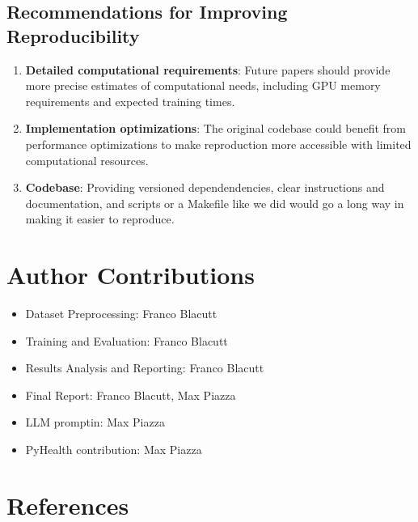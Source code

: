 \documentclass[10pt,letterpaper,twocolumn]{article}
\begin{document}
\subsection{Recommendations for Improving Reproducibility}

\begin{enumerate}
    \item \textbf{Detailed computational requirements}: Future papers should provide more precise estimates of computational needs, including GPU memory requirements and expected training times.
    
    \item \textbf{Implementation optimizations}: The original codebase could benefit from performance optimizations to make reproduction more accessible with limited computational resources.
    
    \item \textbf{Codebase}: Providing versioned dependendencies, clear instructions and documentation, and scripts or a Makefile like we did would go a long way in making it easier to reproduce.
\end{enumerate}

\section*{Author Contributions}

\begin{itemize}
    \item Dataset Preprocessing: Franco Blacutt
    \item Training and Evaluation: Franco Blacutt
    \item Results Analysis and Reporting: Franco Blacutt
    \item Final Report: Franco Blacutt, Max Piazza
    \item LLM promptin: Max Piazza
    \item PyHealth contribution: Max Piazza
\end{itemize}

\section*{References}
\end{document}
